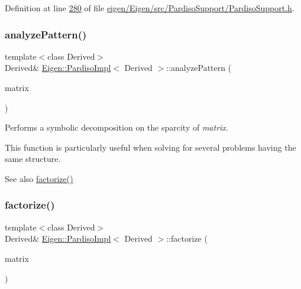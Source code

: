 Definition at line \hyperlink{eigen_2_eigen_2src_2_pardiso_support_2_pardiso_support_8h_source_l00280}{280} of file \hyperlink{eigen_2_eigen_2src_2_pardiso_support_2_pardiso_support_8h_source}{eigen/\+Eigen/src/\+Pardiso\+Support/\+Pardiso\+Support.\+h}.

\mbox{\label{class_eigen_1_1_pardiso_impl_a28f40c0e86c35beaaf4d7e64301f6b6c}} 
\subsubsection{\texorpdfstring{analyze\+Pattern()}{analyzePattern()}\hspace{0.1cm}{\footnotesize\ttfamily [2/2]}}
{\footnotesize\ttfamily template$<$class Derived$>$ \\
Derived\& \hyperlink{class_eigen_1_1_pardiso_impl}{Eigen\+::\+Pardiso\+Impl}$<$ Derived $>$\+::analyze\+Pattern (\begin{DoxyParamCaption}\item[{const Matrix\+Type \&}]{matrix }\end{DoxyParamCaption})}

Performs a symbolic decomposition on the sparcity of {\itshape matrix}.

This function is particularly useful when solving for several problems having the same structure.

\begin{DoxySeeAlso}{See also}
\hyperlink{class_eigen_1_1_pardiso_impl_a6a4c092c5fb581a946d3c4e5ec347dfb}{factorize()} 
\end{DoxySeeAlso}
\mbox{\label{class_eigen_1_1_pardiso_impl_a107e316ad7ffcd683038164d9f804bff}} 
\subsubsection{\texorpdfstring{factorize()}{factorize()}\hspace{0.1cm}{\footnotesize\ttfamily [1/2]}}
{\footnotesize\ttfamily template$<$class Derived$>$ \\
Derived\& \hyperlink{class_eigen_1_1_pardiso_impl}{Eigen\+::\+Pardiso\+Impl}$<$ Derived $>$\+::factorize (\begin{DoxyParamCaption}\item[{const Matrix\+Type \&}]{matrix }\end{DoxyParamCaption})}

